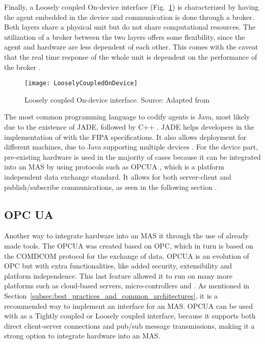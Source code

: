Finally, a Loosely coupled On-device interface (Fig.~\ref{fig:loosely_coupled_ondevice}) is characterized by having the agent embedded in the device and communication is done through a broker. Both layers share a physical unit but do not share computational resources. The utilization of a broker between the two layers offers some flexibility, since the agent and hardware are less dependent of each other. This comes with the caveat that the real time response of the whole unit is dependent on the performance of the broker \cite{8591641}.\\

\begin{figure}[h!]
	\centering
	\texttt{[image: LooselyCoupledOnDevice]}
	\caption{Loosely coupled On-device interface. Source: Adapted from \cite{8591641}}
	\label{fig:loosely_coupled_ondevice}
\end{figure}

The most common programming language to codify agents is Java, most likely due to the existence of  \acrshort{JADE}, followed by C++ \cite{8591641}. \acrshort{JADE} helps developers in the implementation of  with the \acrshort{FIPA} specifications. It also allows deployment for different machines, due to Java supporting multiple devices \cite{JADE_website}.
For the device part, pre-existing hardware is used in the majority of cases because it can be integrated into an \acrshort{MAS} by using protocols such as \acrshort{OPCUA} \cite{8591641}, which is a platform independent data exchange standard. It allows for both server-client and publish/subscribe communications, as seen in the following section \cite{OPCUA_website}.

\subsection{OPC UA}
\label{subsec:opcua}


Another way to integrate hardware into an \acrshort{MAS} it through the use of already made tools. The \acrfull{OPCUA} was created based on \acrfull{OPC}, which in turn is based on the \acrshort{COMDCOM} protocol for the exchange of data. \acrshort{OPCUA} is an evolution of \acrshort{OPC} but with extra functionalities, like added security, extensibility and platform independence. This last feature allowed it to run on many more platforms such as cloud-based servers, micro-controllers and  \cite{OPCUA_website}. As mentioned in Section~\ref{subsec:best_practices_and_common_architectures}, it is a recommended way to implement an interface for an \acrshort{MAS}. \acrshort{OPCUA} can be used with as a Tightly coupled or Loosely coupled interface, because it supports both direct client-server connections and pub/sub message transmissions, making it a strong option to integrate hardware into an \acrshort{MAS}.\\

